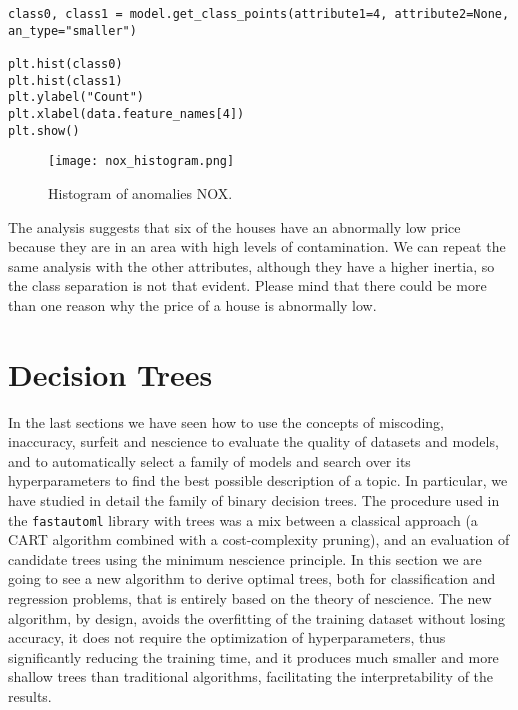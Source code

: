\begin{sourcecode}
{\scriptsize \begin{verbatim}
class0, class1 = model.get_class_points(attribute1=4, attribute2=None, an_type="smaller")

plt.hist(class0)
plt.hist(class1)
plt.ylabel("Count")
plt.xlabel(data.feature_names[4])
plt.show()
\end{verbatim}}
\end{sourcecode}

\begin{figure}[h]
\centering
\texttt{[image: nox\_histogram.png]}
\caption{Histogram of anomalies NOX.}
\label{figure:nox_histogram}
\end{figure}

The analysis suggests that six of the houses have an abnormally low price because they are in an area with high levels of contamination. We can repeat the same analysis with the other attributes, although they have a higher inertia, so the class separation is not that evident. Please mind that there could be more than one reason why the price of a house is abnormally low. 



%
%

\section{Decision Trees}
\label{sec:decision_trees}

In the last sections we have seen how to use the concepts of miscoding, inaccuracy, surfeit and nescience to evaluate the quality of datasets and models, and to automatically select a family of models and search over its hyperparameters to find the best possible description of a topic. In particular, we have studied in detail the family of binary decision trees. The procedure used in the \texttt{fastautoml} library with trees was a mix between a classical approach (a CART algorithm combined with a cost-complexity pruning), and an evaluation of candidate trees using the minimum nescience principle. In this section we are going to see a new algorithm to derive optimal trees, both for classification and regression problems, that is entirely based on the theory of nescience. The new algorithm, by design, avoids the overfitting of the training dataset without losing accuracy, it does not require the optimization of hyperparameters, thus significantly reducing the training time, and it produces much smaller and more shallow trees than traditional algorithms, facilitating the interpretability of the results.

